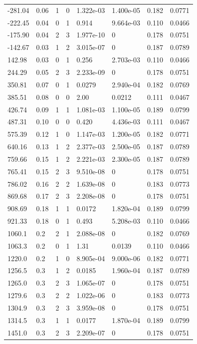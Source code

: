 \documentclass[preview]{standalone}
\begin{document}
{{\begin{tabular}{L{1.2cm}C{1.2cm} C{0.3cm}C{0.5cm} C{1.4cm}C{1.4cm} C{1.4cm}C{1.4cm}}
  -281.04  &  0.06  & 1     &  0 &  1.322e-03  & 1.400e-05  & 0.182 &  0.0771   \\ 
  -222.45  &  0.04  & 0     &  1 &  0.914  & 9.664e-03  & 0.110 &  0.0466   \\ 
  -175.90  &  0.04  & 2     &  3 &  1.977e-10  & 0  & 0.178 &  0.0751   \\ 
  -142.67  &  0.03  & 1     &  2 &  3.015e-07  & 0  & 0.187 &  0.0789   \\ 
  142.98  &  0.03  & 0     &  1 &  0.256  & 2.703e-03  & 0.110 &  0.0466   \\ 
  244.29  &  0.05  & 2     &  3 &  2.233e-09  & 0  & 0.178 &  0.0751   \\ 
  350.81  &  0.07  & 0     &  1 &  0.0279  & 2.940e-04  & 0.182 &  0.0769   \\ 
  385.51  &  0.08  & 0     &  0 &  2.00  & 0.0212  & 0.111 &  0.0467   \\ 
  426.74  &  0.09  & 1     &  1 &  1.081e-03  & 1.100e-05  & 0.189 &  0.0799   \\ 
  487.31  &  0.10  & 0     &  0 &  0.420  & 4.436e-03  & 0.111 &  0.0467   \\ 
  575.39  &  0.12  & 1     &  0 &  1.147e-03  & 1.200e-05  & 0.182 &  0.0771   \\ 
  640.16  &  0.13  & 1     &  2 &  2.377e-03  & 2.500e-05  & 0.187 &  0.0789   \\ 
  759.66  &  0.15  & 1     &  2 &  2.221e-03  & 2.300e-05  & 0.187 &  0.0789   \\ 
  765.41  &  0.15  & 2     &  3 &  9.510e-08  & 0  & 0.178 &  0.0751   \\ 
  786.02  &  0.16  & 2     &  2 &  1.639e-08  & 0  & 0.183 &  0.0773   \\ 
  869.68  &  0.17  & 2     &  3 &  2.208e-08  & 0  & 0.178 &  0.0751   \\ 
  908.69  &  0.18  & 1     &  1 &  0.0172  & 1.820e-04  & 0.189 &  0.0799   \\ 
  921.33  &  0.18  & 0     &  1 &  0.493  & 5.208e-03  & 0.110 &  0.0466   \\ 
  1060.1  &   0.2  & 2     &  1 &  2.088e-08  & 0  & 0.182 &  0.0769   \\ 
  1063.3  &   0.2  & 0     &  1 &  1.31  & 0.0139  & 0.110 &  0.0466   \\ 
  1220.0  &   0.2  & 1     &  0 &  8.905e-04  & 9.000e-06  & 0.182 &  0.0771   \\ 
  1256.5  &   0.3  & 1     &  2 &  0.0185  & 1.960e-04  & 0.187 &  0.0789   \\ 
  1265.0  &   0.3  & 2     &  3 &  1.065e-07  & 0  & 0.178 &  0.0751   \\ 
  1279.6  &   0.3  & 2     &  2 &  1.022e-06  & 0  & 0.183 &  0.0773   \\ 
  1304.9  &   0.3  & 2     &  3 &  3.959e-08  & 0  & 0.178 &  0.0751   \\ 
  1314.5  &   0.3  & 1     &  1 &  0.0177  & 1.870e-04  & 0.189 &  0.0799   \\ 
  1451.0  &   0.3  & 2     &  3 &  2.209e-07  & 0  & 0.178 &  0.0751   \\ 
\hline 
\end{tabular} 

}}
\end{document}
